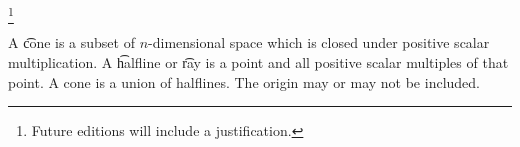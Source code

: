 
\footnote{Future editions will include a justification.}



A \t{cone} is a subset of $n$-dimensional space which is closed under positive scalar multiplication.
A \t{halfline} or \t{ray} is a point and all positive scalar multiples of that point.
A cone is a union of halflines.
The origin may or may not be included.

\blankpage
